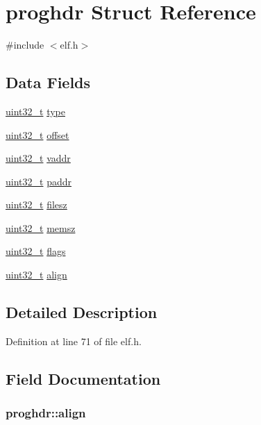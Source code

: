 \hypertarget{structproghdr}{\section{proghdr \-Struct \-Reference}
\label{structproghdr}
}


{\ttfamily \#include $<$elf.\-h$>$}

\subsection*{\-Data \-Fields}
\begin{DoxyCompactItemize}
\item 
\hyperlink{types_8h_a435d1572bf3f880d55459d9805097f62}{uint32\-\_\-t} \hyperlink{structproghdr_a523c83d0b884fb303b4b079e86a6aa55}{type}
\item 
\hyperlink{types_8h_a435d1572bf3f880d55459d9805097f62}{uint32\-\_\-t} \hyperlink{structproghdr_a13ca31beed71b97e906646eb21ab7c43}{offset}
\item 
\hyperlink{types_8h_a435d1572bf3f880d55459d9805097f62}{uint32\-\_\-t} \hyperlink{structproghdr_ac7edbebc9b5120c39b49301851765c42}{vaddr}
\item 
\hyperlink{types_8h_a435d1572bf3f880d55459d9805097f62}{uint32\-\_\-t} \hyperlink{structproghdr_aee40352ae868f605ca540d8d7c1ad71d}{paddr}
\item 
\hyperlink{types_8h_a435d1572bf3f880d55459d9805097f62}{uint32\-\_\-t} \hyperlink{structproghdr_ada45841c63724ee15300232b0317d1c3}{filesz}
\item 
\hyperlink{types_8h_a435d1572bf3f880d55459d9805097f62}{uint32\-\_\-t} \hyperlink{structproghdr_a1d2b052eeb75a24234f4fbb087205f71}{memsz}
\item 
\hyperlink{types_8h_a435d1572bf3f880d55459d9805097f62}{uint32\-\_\-t} \hyperlink{structproghdr_a5129c882410bcae83437e65617a9d0b3}{flags}
\item 
\hyperlink{types_8h_a435d1572bf3f880d55459d9805097f62}{uint32\-\_\-t} \hyperlink{structproghdr_a5912e1e2fba82b61114bdb12c50325a0}{align}
\end{DoxyCompactItemize}


\subsection{\-Detailed \-Description}


\-Definition at line 71 of file elf.\-h.



\subsection{\-Field \-Documentation}
\hypertarget{structproghdr_a5912e1e2fba82b61114bdb12c50325a0}{
\subsubsection[{align}]{ {\bf proghdr\-::align}}}\label{structproghdr_a5912e1e2fba82b61114bdb12c50325a0}


